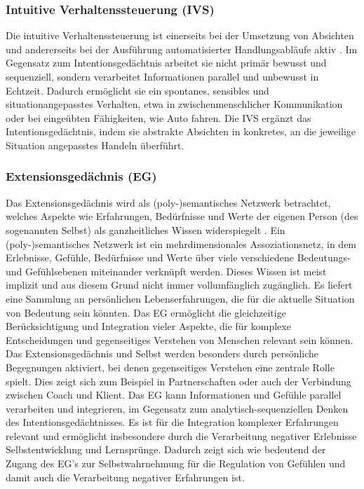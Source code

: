 \subsubsection{Intuitive Verhaltenssteuerung (IVS)}
Die intuitive Verhaltenssteuerung ist einerseits bei der Umsetzung von Absichten und andererseits bei der Ausführung automatisierter Handlungsabläufe aktiv \citep{kuhl2014psi}. Im Gegensatz zum Intentionsgedächtnis arbeitet sie nicht primär bewusst und sequenziell, sondern verarbeitet Informationen parallel und unbewusst in Echtzeit. Dadurch ermöglicht sie ein spontanes, sensibles und situationangepasstes Verhalten, etwa in zwischenmenschlicher Kommunikation oder bei eingeübten Fähigkeiten, wie Auto fahren. Die IVS ergänzt das Intentionsgedächtnis, indem sie abstrakte Absichten in konkretes, an die jeweilige Situation angepasstes Handeln überführt.

\subsubsection{Extensionsgedächnis (EG)}
Das Extensionsgedächnis wird als (poly-)semantisches Netzwerk betrachtet, welches Aspekte wie Erfahrungen, Bedürfnisse und Werte der eigenen Person (des sogenannten Selbst) als ganzheitliches Wissen widerspiegelt \citep{kuhl2005neue,kuhl2014psi}. Ein (poly-)semantisches Netzwerk ist ein mehrdimensionales Assoziationsnetz, in dem Erlebnisse, Gefühle, Bedürfnisse und Werte über viele verschiedene Bedeutungs- und Gefühlsebenen miteinander verknüpft werden. Dieses Wissen ist meist implizit und aus diesem Grund nicht immer vollumfänglich zugänglich. Es liefert eine Sammlung an persönlichen Lebenserfahrungen, die für die aktuelle Situation von Bedeutung sein könnten. Das EG ermöglicht die gleichzeitige
Berücksichtigung und Integration vieler Aspekte, die für komplexe Entscheidungen und gegenseitiges Verstehen von Menschen relevant sein können. Das Extensionsgedächnis und Selbst werden besonders durch persönliche Begegnungen aktiviert, bei denen gegenseitiges Verstehen eine zentrale Rolle spielt. Dies zeigt sich zum Beispiel in Partnerschaften oder auch der Verbindung zwischen Coach und Klient. Das EG kann Informationen und Gefühle parallel verarbeiten und integrieren, im Gegensatz zum analytisch-sequenziellen Denken des Intentionsgedächtnisses. Es ist für die Integration komplexer Erfahrungen relevant und ermöglicht insbesondere durch die Verarbeitung negativer Erlebnisse Selbstentwicklung und Lernsprünge. Dadurch zeigt sich wie bedeutend der Zugang des EG's zur Selbstwahrnehmung für die Regulation von Gefühlen und damit auch die Verarbeitung negativer Erfahrungen ist.

